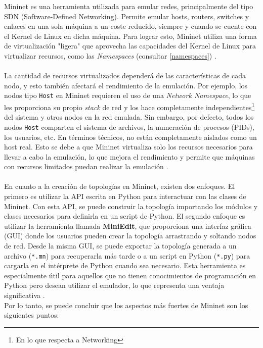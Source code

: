 Mininet es una herramienta utilizada para emular redes, principalmente del tipo SDN (Software-Defined Networking). Permite emular hosts, routers, switches y enlaces en una sola máquina a un coste reducido, siempre y cuando se cuente con el Kernel de Linux en dicha máquina. Para lograr esto, Mininet utiliza una forma de virtualización "ligera" que aprovecha las capacidades del Kernel de Linux para virtualizar recursos, como las \textit{Namespaces} (consultar \ref{namespaces}) \cite{lantz2010network}.\\
\\
La cantidad de recursos virtualizados dependerá de las características de cada nodo, y esto también afectará el rendimiento de la emulación. Por ejemplo, los nodos tipo \texttt{Host} en Mininet requieren el uso de una \textit{Network Namespace}, lo que les proporciona su propio \textit{stack} de red y los hace completamente independientes\footnote{En lo que respecta a Networking} del sistema y otros nodos en la red emulada. Sin embargo, por defecto, todos los nodos \texttt{Host} comparten el sistema de archivos, la numeración de procesos (PIDs), los usuarios, etc. En términos técnicos, no están completamente aislados como un host real. Esto se debe a que Mininet virtualiza solo los recursos necesarios para llevar a cabo la emulación, lo que mejora el rendimiento y permite que máquinas con recursos limitados puedan realizar la emulación \cite{lantz2010network}.\\
\\
En cuanto a la creación de topologías en Mininet, existen dos enfoques. El primero es utilizar la API escrita en Python para interactuar con las clases de Mininet. Con esta API, se puede construir la topología importando los módulos y clases necesarios para definirla en un script de Python. El segundo enfoque es utilizar la herramienta llamada \textbf{MiniEdit}, que proporciona una interfaz gráfica (GUI) donde los usuarios pueden crear la topología arrastrando y soltando nodos de red. Desde la misma GUI, se puede exportar la topología generada a un archivo (\texttt{*.mn}) para recuperarla más tarde o a un script en Python (\texttt{*.py}) para cargarla en el intérprete de Python cuando sea necesario. Esta herramienta es especialmente útil para aquellos que no tienen conocimientos de programación en Python pero desean utilizar el emulador, lo que representa una ventaja significativa \cite{lantz2010network}.\\

Por lo tanto, se puede concluir que los aspectos más fuertes de Mininet son los siguientes puntos:

